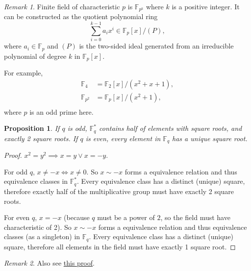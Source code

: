 \documentclass[12pt, letterpaper]{article}
\newcommand{\field}{\mathbb{F}}
\newtheorem{prop}{Proposition}[section]
\theoremstyle{definition}
\theoremstyle{remark}
\newtheorem*{rem*}{Remark}
\theoremstyle{definition}
\theoremstyle{plain}
\numberwithin{equation}{section}
\begin{document}
	\begin{rem*}
		Finite field of characteristic $p$ is $\field_{p^k}$ where $k$ is a positive integer.
		It can be constructed as
		the quotient polynomial ring
		\[\sum_{i=0}^{k-1} a_ix^i \in \field_p[x]/(P), \]
		where $a_i\in\field_p$ and $(P)$ is the two-sided ideal
		generated from an irreducible polynomial of degree $k$ in $\field_p[x]$.
		
		For example,
		\[ \begin{aligned}
			\field_4&=\field_2[x]/(x^2+x+1),\\
			\field_{p^2}&=\field_p[x]/(x^2+1),\\
		\end{aligned} \]
		where $p$ is an odd prime here.
	\end{rem*}

	\begin{prop}
		If $q$ is odd, $\field_q^*$ contains half of elements with square roots, and exactly 2 square roots.
		If $q$ is even, every element in $\field_q$ has a unique square root.
	\end{prop}
	\begin{proof}
		$x^2=y^2\implies x=y\lor x=-y$.
		
		For odd $q$, $x\ne-x\iff x\ne0$.
		So $x\sim-x$ forms a equivalence relation and thus equivalence classes in $\field_q^*$.
		Every equivalence class has a distinct (unique) square, therefore exactly half of the multiplicative group
		must have exactly 2 square roots.
		
		For even $q$, $x=-x$ (because $q$ must be a power of $2$, so the field must have characteristic of 2).
		So $x\sim-x$ forms a equivalence relation and thus equivalence classes (as a singleton) in $\field_q$.
		Every equivalence class has a distinct (unique) square, therefore all elements in the field
		must have exactly 1 square root.
	\end{proof}
	\begin{rem*}
		Also see \href{http://cap-lore.com/MathPhys/Field/finite/sqrt.html}{this proof}.
	\end{rem*}
\end{document}
